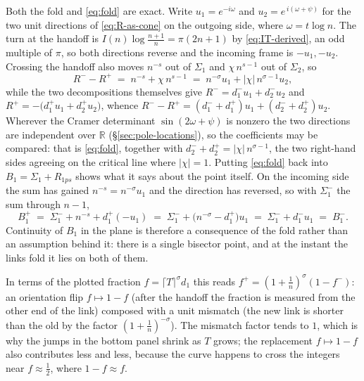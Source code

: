\documentclass[11pt]{article}
\theoremstyle{definition}
\begin{document}
Both the fold and \eqref{eq:fold} are exact. Write $u_1=e^{-i\omega}$ and
$u_2=e^{\,i(\omega+\psi)}$ for the two unit directions of
\eqref{eq:R-as-cone} on the outgoing side, where $\omega=t\log n$. The turn
at the handoff is $I(n)\log\frac{n+1}{n}=\pi(2n+1)$ by
\eqref{eq:IT-derived}, an odd multiple of $\pi$, so both directions reverse
and the incoming frame is $-u_1,-u_2$. Crossing the handoff also moves
$n^{-s}$ out of $\Sigma_1$ and $\chi\,n^{s-1}$ out of $\Sigma_2$, so
\[
R^{-}-R^{+} \;=\; n^{-s}+\chi\,n^{s-1}
\;=\; n^{-\sigma}u_1+|\chi|\,n^{\sigma-1}u_2 ,
\]
while the two decompositions themselves give
$R^{-}=d_1^{-}u_1+d_2^{-}u_2$ and $R^{+}=-\bigl(d_1^{+}u_1+d_2^{+}u_2\bigr)$,
whence $R^{-}-R^{+}=(d_1^{-}+d_1^{+})u_1+(d_2^{-}+d_2^{+})u_2$. Wherever the
Cramer determinant $\sin(2\omega+\psi)$ is nonzero the two directions are
independent over $\mathbb{R}$ (\S\ref{sec:pole-locations}), so the
coefficients may be compared: that is \eqref{eq:fold}, together with
$d_2^{-}+d_2^{+}=|\chi|\,n^{\sigma-1}$, the two right-hand sides agreeing on
the critical line where $|\chi|=1$. Putting \eqref{eq:fold} back into
$B_1=\Sigma_1+R_{1ps}$ shows what it says about the point itself. On the
incoming side the sum has gained $n^{-s}=n^{-\sigma}u_1$ and the direction has
reversed, so with $\Sigma_1^{-}$ the sum through $n-1$,
\[
B_1^{+} \;=\; \Sigma_1^{-}+n^{-s}+d_1^{+}(-u_1)
\;=\; \Sigma_1^{-}+\bigl(n^{-\sigma}-d_1^{+}\bigr)u_1
\;=\; \Sigma_1^{-}+d_1^{-}u_1 \;=\; B_1^{-} .
\]
Continuity of $B_1$ in the plane is therefore a consequence of the fold
rather than an assumption behind it: there is a single bisector point, and at
the instant the links fold it lies on both of them.

In terms of the plotted fraction $f=\lceil T\rceil^{\sigma} d_1$ this reads
$f^{+}=(1+\tfrac1n)^{\sigma}(1-f^{-})$: an orientation flip $f\mapsto 1-f$
(after the handoff the fraction is measured from the other end of the link)
composed with a unit mismatch (the new link is shorter than the old by the
factor $(1+\tfrac1n)^{-\sigma}$). The mismatch factor tends to $1$, which is
why the jumps in the bottom panel shrink as $T$ grows; the replacement
$f\mapsto 1-f$ also contributes less and less, because the curve happens to
cross the integers near $f\approx\tfrac12$, where $1-f\approx f$.
\end{document}
